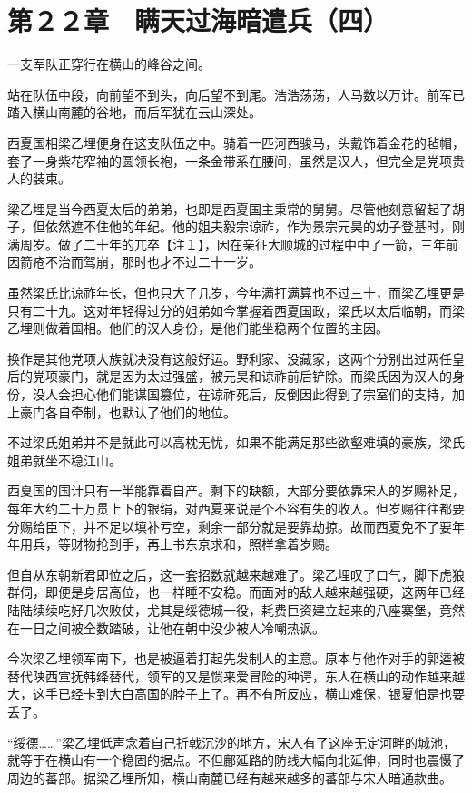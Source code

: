 \section{第２２章　瞒天过海暗遣兵（四）}

一支军队正穿行在横山的峰谷之间。

站在队伍中段，向前望不到头，向后望不到尾。浩浩荡荡，人马数以万计。前军已踏入横山南麓的谷地，而后军犹在云山深处。

西夏国相梁乙埋便身在这支队伍之中。骑着一匹河西骏马，头戴饰着金花的毡帽，套了一身紫花窄袖的圆领长袍，一条金带系在腰间，虽然是汉人，但完全是党项贵人的装束。

梁乙埋是当今西夏太后的弟弟，也即是西夏国主秉常的舅舅。尽管他刻意留起了胡子，但依然遮不住他的年纪。他的姐夫毅宗谅祚，作为景宗元昊的幼子登基时，刚满周岁。做了二十年的兀卒【注１】，因在亲征大顺城的过程中中了一箭，三年前因箭疮不治而驾崩，那时也才不过二十一岁。

虽然梁氏比谅祚年长，但也只大了几岁，今年满打满算也不过三十，而梁乙埋更是只有二十九。这对年轻得过分的姐弟如今掌握着西夏国政，梁氏以太后临朝，而梁乙埋则做着国相。他们的汉人身份，是他们能坐稳两个位置的主因。

换作是其他党项大族就决没有这般好运。野利家、没藏家，这两个分别出过两任皇后的党项豪门，就是因为太过强盛，被元昊和谅祚前后铲除。而梁氏因为汉人的身份，没人会担心他们能谋国篡位，在谅祚死后，反倒因此得到了宗室们的支持，加上豪门各自牵制，也默认了他们的地位。

不过梁氏姐弟并不是就此可以高枕无忧，如果不能满足那些欲壑难填的豪族，梁氏姐弟就坐不稳江山。

西夏国的国计只有一半能靠着自产。剩下的缺额，大部分要依靠宋人的岁赐补足，每年大约二十万贯上下的银绢，对西夏来说是个不容有失的收入。但岁赐往往都要分赐给臣下，并不足以填补亏空，剩余一部分就是要靠劫掠。故而西夏免不了要年年用兵，等财物抢到手，再上书东京求和，照样拿着岁赐。

但自从东朝新君即位之后，这一套招数就越来越难了。梁乙埋叹了口气，脚下虎狼群伺，即便是身居高位，也一样睡不安稳。而面对的敌人越来越强硬，这两年已经陆陆续续吃好几次败仗，尤其是绥德城一役，耗费巨资建立起来的八座寨堡，竟然在一日之间被全数踏破，让他在朝中没少被人冷嘲热讽。

今次梁乙埋领军南下，也是被逼着打起先发制人的主意。原本与他作对手的郭逵被替代陕西宣抚韩绛替代，领军的又是惯来爱冒险的种谔，东人在横山的动作越来越大，这手已经卡到大白高国的脖子上了。再不有所反应，横山难保，银夏怕是也要丢了。

“绥德……”梁乙埋低声念着自己折戟沉沙的地方，宋人有了这座无定河畔的城池，就等于在横山有一个稳固的据点。不但鄜延路的防线大幅向北延伸，同时也震慑了周边的蕃部。据梁乙埋所知，横山南麓已经有越来越多的蕃部与宋人暗通款曲。

